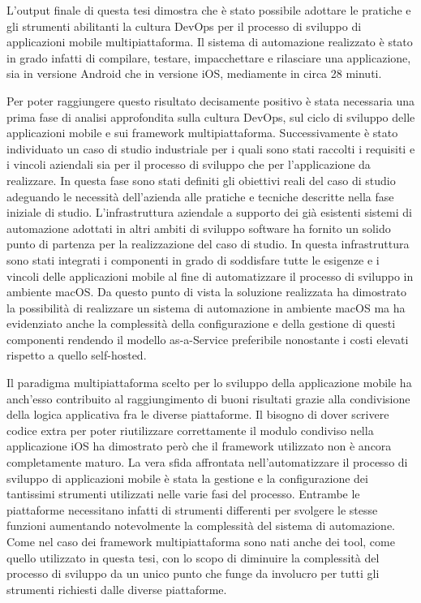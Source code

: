 
L'output finale di questa tesi dimostra che è stato possibile adottare le pratiche e gli strumenti abilitanti la cultura DevOps per il processo di sviluppo di applicazioni mobile multipiattaforma. Il sistema di automazione realizzato è stato in grado infatti di compilare, testare, impacchettare e rilasciare una applicazione, sia in versione Android che in versione iOS, mediamente in circa 28 minuti.

Per poter raggiungere questo risultato decisamente positivo è stata necessaria una prima fase di analisi approfondita sulla cultura DevOps, sul ciclo di sviluppo delle applicazioni mobile e sui framework multipiattaforma. Successivamente è stato individuato un caso di studio industriale per i quali sono stati raccolti i requisiti e i vincoli aziendali sia per il processo di sviluppo che per l'applicazione da realizzare. In questa fase sono stati definiti gli obiettivi reali del caso di studio adeguando le necessità dell'azienda alle pratiche e tecniche descritte nella fase iniziale di studio. L'infrastruttura aziendale a supporto dei già esistenti sistemi di automazione adottati in altri ambiti di sviluppo software ha fornito un solido punto di partenza per la realizzazione del caso di studio. In questa infrastruttura sono stati integrati i componenti in grado di soddisfare tutte le esigenze e i vincoli delle applicazioni mobile al fine di automatizzare il processo di sviluppo in ambiente macOS. Da questo punto di vista la soluzione realizzata ha dimostrato la possibilità di realizzare un sistema di automazione in ambiente macOS ma ha evidenziato anche la complessità della configurazione e della gestione di questi componenti rendendo il modello as-a-Service preferibile nonostante i costi elevati rispetto a quello self-hosted.

Il paradigma multipiattaforma scelto per lo sviluppo della applicazione mobile ha anch'esso contribuito al raggiungimento di buoni risultati grazie alla condivisione della logica applicativa fra le diverse piattaforme. Il bisogno di dover scrivere codice extra per poter riutilizzare correttamente il modulo condiviso nella applicazione iOS ha dimostrato però che il framework utilizzato non è ancora completamente maturo. La vera sfida affrontata nell'automatizzare il processo di sviluppo di applicazioni mobile è stata la gestione e la configurazione dei tantissimi strumenti utilizzati nelle varie fasi del processo. Entrambe le piattaforme necessitano infatti di strumenti differenti per svolgere le stesse funzioni aumentando notevolmente la complessità del sistema di automazione. Come nel caso dei framework multipiattaforma sono nati anche dei tool, come quello utilizzato in questa tesi, con lo scopo di diminuire la complessità del processo di sviluppo da un unico punto che funge da involucro per tutti gli strumenti richiesti dalle diverse piattaforme.